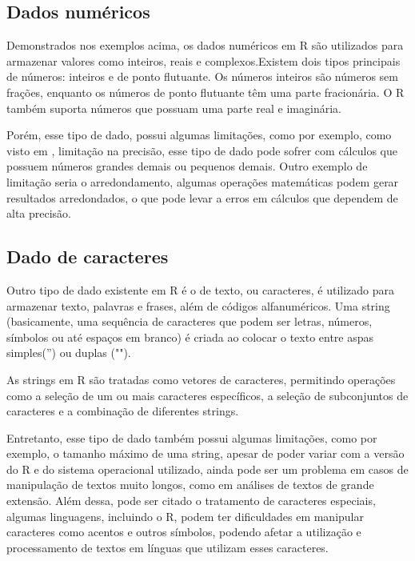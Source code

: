    \subsection{Dados numéricos}
    	Demonstrados nos exemplos acima, os dados numéricos em R são utilizados para armazenar valores como inteiros, reais e complexos.Existem dois tipos principais de números: inteiros e de ponto flutuante. Os números inteiros são números sem frações, enquanto os números de ponto flutuante têm uma parte fracionária. O R também suporta números que possuam uma parte real e imaginária.\par
    	Porém, esse tipo de dado, possui algumas limitações, como por exemplo, como visto em \cite{Cotton2013}, limitação na precisão, esse tipo de dado pode sofrer com cálculos que possuem números grandes demais ou pequenos demais. Outro exemplo de limitação seria o arredondamento, algumas operações matemáticas podem gerar resultados arredondados, o que pode levar a erros em cálculos que dependem de alta precisão.
    \subsection{Dado de caracteres}
    	Outro tipo de dado existente em R é o de texto, ou caracteres, é utilizado para armazenar texto, palavras e frases, além de códigos alfanuméricos. Uma string (basicamente, uma sequência de caracteres que podem ser letras, números, símbolos ou até espaços em branco) é criada ao colocar o texto entre aspas simples('') ou duplas ("").\par
    	As strings em R são tratadas como vetores de caracteres, permitindo operações como a seleção de um ou mais caracteres específicos, a seleção de subconjuntos de caracteres e a combinação de diferentes strings.\par 
    	Entretanto, esse tipo de dado também possui algumas limitações, como por exemplo, o tamanho máximo de uma string, apesar de poder variar com a versão do R e do sistema operacional utilizado, ainda pode ser um problema em casos de manipulação de textos muito longos, como em análises de textos de grande extensão. Além dessa, pode ser citado o tratamento de caracteres especiais, algumas linguagens, incluindo o R, podem ter dificuldades em manipular caracteres como acentos e outros símbolos, podendo afetar a utilização e processamento de textos em línguas que utilizam esses caracteres.

